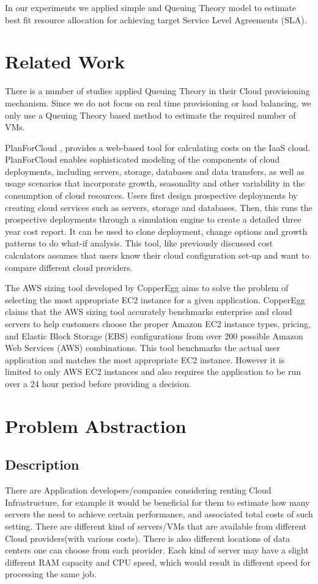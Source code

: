 In our experiments we  applied simple and Queuing Theory \cite{queueing_theory} model to estimate best fit resource allocation for achieving target Service Level Agreements (SLA).

\section{Related Work}

There is a number of studies \cite{lee:10,RodrigoICPP,xuzichuan} applied Queuing Theory in their Cloud provisioning mechanism. Since we do not focus on real time provisioning or load balancing, we only use a Queuing Theory based method to estimate the required number of VMs. 

PlanForCloud \cite{PlanForCloud}, provides a web-based tool for calculating costs on the IaaS cloud. PlanForCloud enables sophisticated modeling of the components of cloud deployments, including servers, storage, databases and data transfers, as well as usage scenarios that incorporate growth, seasonality and other variability in the consumption of cloud resources. Users first design prospective deployments by creating cloud services such as servers, storage and databases. Then, this runs the prospective deployments through a simulation engine to create a detailed three year cost report. It can be used to clone deployment, change options and growth patterns to do what-if analysis. This tool, like previously discussed cost calculators assumes that users know their cloud configuration set-up
and want to compare different cloud providers.

The AWS sizing tool developed by CopperEgg \cite{AWS_Sizing_Tool} aims to solve the problem of selecting the most appropriate EC2 instance for a given application. CopperEgg claims that the AWS sizing tool accurately benchmarks enterprise and cloud servers to help customers choose the proper Amazon EC2 instance types, pricing, and Elastic Block Storage (EBS) configurations from over 200 possible Amazon Web Services (AWS) combinations. This tool benchmarks the actual user application and matches the most appropriate EC2 instance. However it is limited to only AWS EC2 instances and also requires the application to be run over a 24 hour period before providing a decision.

\section{Problem Abstraction}
\subsection{Description}
There are Application developers/companies considering renting Cloud Infrastructure, for example it would be beneficial for them to estimate how many servers the need to achieve certain performance, and associated total costs of such setting.
There are different kind of servers/VMs that are available from different Cloud providers(with various costs).
There is also different locations of data centers one can choose from each provider. Each kind of server may have a slight different RAM capacity and CPU speed, which would result in different speed for processing the same job.

